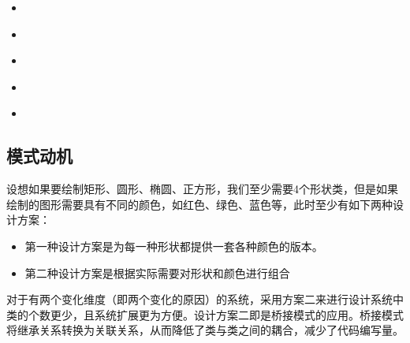 \documentclass[letterpaper,10pt,english]{sphinxmanual}
\begin{document}
\begin{sphinxShadowBox}
\begin{itemize}
\begin{itemize}
\item {} 
\sphinxAtStartPar
{}\label{\detokenize{structural_patterns/bridge:id25}}{\hyperref[\detokenize{structural_patterns/bridge:id11}]{}}

\item {} 
\sphinxAtStartPar
{}\label{\detokenize{structural_patterns/bridge:id26}}{\hyperref[\detokenize{structural_patterns/bridge:id12}]{}}

\item {} 
\sphinxAtStartPar
{}\label{\detokenize{structural_patterns/bridge:id27}}{\hyperref[\detokenize{structural_patterns/bridge:id13}]{}}

\item {} 
\sphinxAtStartPar
{}\label{\detokenize{structural_patterns/bridge:id28}}{\hyperref[\detokenize{structural_patterns/bridge:id14}]{}}

\item {} 
\sphinxAtStartPar
{}\label{\detokenize{structural_patterns/bridge:id29}}{\hyperref[\detokenize{structural_patterns/bridge:id15}]{}}

\end{itemize}

\end{itemize}
\end{sphinxShadowBox}


\subsection{模式动机}
\label{\detokenize{structural_patterns/bridge:id3}}
\sphinxAtStartPar
设想如果要绘制矩形、圆形、椭圆、正方形，我们至少需要4个形状类，但是如果绘制的图形需要具有不同的颜色，如红色、绿色、蓝色等，此时至少有如下两种设计方案：
\begin{itemize}
\item {} 
\sphinxAtStartPar
第一种设计方案是为每一种形状都提供一套各种颜色的版本。

\item {} 
\sphinxAtStartPar
第二种设计方案是根据实际需要对形状和颜色进行组合

\end{itemize}

\sphinxAtStartPar
对于有两个变化维度（即两个变化的原因）的系统，采用方案二来进行设计系统中类的个数更少，且系统扩展更为方便。设计方案二即是桥接模式的应用。桥接模式将继承关系转换为关联关系，从而降低了类与类之间的耦合，减少了代码编写量。
\end{document}
